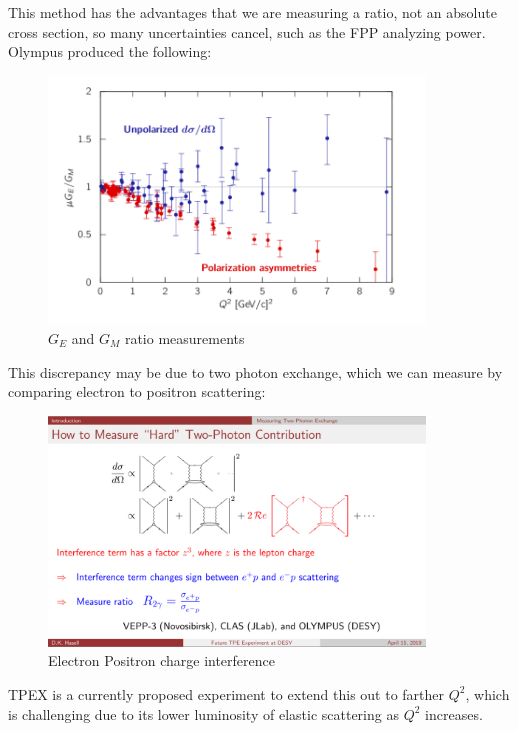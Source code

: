             This method has the advantages that we are measuring a ratio, not an absolute cross section, so many uncertainties cancel, such as the FPP analyzing power. Olympus produced the following:
            
                  
            \begin{figure}[H]
                \centering
                \includegraphics[width=10cm]{Chapters/Ch1-Intro/Ch1-Sec1-Background/pics/elastic-ep/olympus-form-factors.PNG}
                \caption{$G_E$ and $G_M$ ratio measurements}
            \end{figure}
            
            This discrepancy may be due to two photon exchange, which we can measure by comparing electron to positron scattering:
            
                  
            \begin{figure}[H]
                \centering
                \includegraphics[width=10cm]{Chapters/Ch1-Intro/Ch1-Sec1-Background/pics/elastic-ep/tpex.PNG}
                \caption{Electron Positron charge interference}
            \end{figure}
        
        
            TPEX is a currently proposed experiment to extend this out to farther $Q^2$, which is challenging due to its lower luminosity of elastic scattering as $Q^2$ increases.    

            \fi
            








\fi